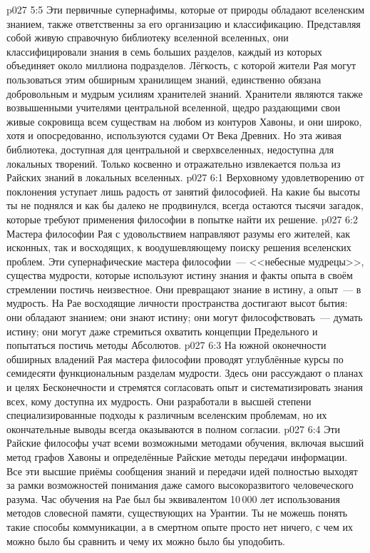 \vs p027 5:5 Эти первичные супернафимы, которые от природы обладают вселенским знанием, также ответственны за его организацию и классификацию. Представляя собой живую справочную библиотеку вселенной вселенных, они классифицировали знания в семь больших разделов, каждый из которых объединяет около миллиона подразделов. Лёгкость, с которой жители Рая могут пользоваться этим обширным хранилищем знаний, единственно обязана добровольным и мудрым усилиям хранителей знаний. Хранители являются также возвышенными учителями центральной вселенной, щедро раздающими свои живые сокровища всем существам на любом из контуров Хавоны, и они широко, хотя и опосредованно, используются судами От Века Древних. Но эта живая библиотека, доступная для центральной и сверхвселенных, недоступна для локальных творений. Только косвенно и отражательно извлекается польза из Райских знаний в локальных вселенных.
\vs p027 6:1 Верховному удовлетворению от поклонения уступает лишь радость от занятий философией. На какие бы высоты ты не поднялся и как бы далеко не продвинулся, всегда остаются тысячи загадок, которые требуют применения философии в попытке найти их решение.
\vs p027 6:2 Мастера философии Рая с удовольствием направляют разумы его жителей, как исконных, так и восходящих, к воодушевляющему поиску решения вселенских проблем. Эти супернафические мастера философии~--- <<небесные мудрецы>>, существа мудрости, которые используют истину знания и факты опыта в своём стремлении постичь неизвестное. Они превращают знание в истину, а опыт~--- в мудрость. На Рае восходящие личности пространства достигают высот бытия: они обладают знанием; они знают истину; они могут философствовать~--- думать истину; они могут даже стремиться охватить концепции Предельного и попытаться постичь методы Абсолютов.
\vs p027 6:3 На южной оконечности обширных владений Рая мастера философии проводят углублённые курсы по семидесяти функциональным разделам мудрости. Здесь они рассуждают о планах и целях Бесконечности и стремятся согласовать опыт и систематизировать знания всех, кому доступна их мудрость. Они разработали в высшей степени специализированные подходы к различным вселенским проблемам, но их окончательные выводы всегда оказываются в полном согласии.
\vs p027 6:4 Эти Райские философы учат всеми возможными методами обучения, включая высший метод графов Хавоны и определённые Райские методы передачи информации. Все эти высшие приёмы сообщения знаний и передачи идей полностью выходят за рамки возможностей понимания даже самого высокоразвитого человеческого разума. Час обучения на Рае был бы эквивалентом 10\,000 лет использования методов словесной памяти, существующих на Урантии. Ты не можешь понять такие способы коммуникации, а в смертном опыте просто нет ничего, с чем их можно было бы сравнить и чему их можно было бы уподобить.
